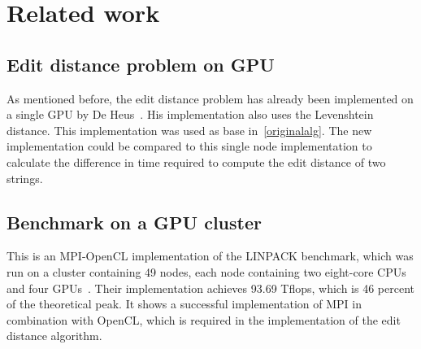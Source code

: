 \section{Related work}

\subsection{Edit distance problem on GPU}
As mentioned before, the edit distance problem has already been implemented on a single GPU by De Heus~\cite{Heus}.
His implementation also uses the Levenshtein distance.
This implementation was used as base in~\cref{originalalg}.
The new implementation could be compared to this single node implementation to calculate the difference in time required to compute the edit distance of two strings.

\subsection{Benchmark on a GPU cluster}
This is an MPI-OpenCL implementation of the LINPACK benchmark, which was run on a cluster containing 49 nodes, each node containing two eight-core CPUs and four GPUs~\cite{Cluster}.
Their implementation achieves 93.69 Tflops, which is 46 percent of the theoretical peak.
It shows a successful implementation of MPI in combination with OpenCL, which is required in the implementation of the edit distance algorithm.
